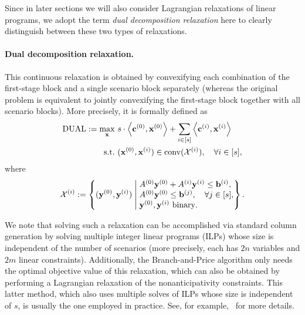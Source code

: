 \documentclass{article}
\DeclareMathOperator{\conv}{\operatorname{conv}}
\newcommand{\cv}[0]{\mathbf{c}}
\newcommand{\xv}[0]{\mathbf{x}}
\newcommand{\yv}[0]{\mathbf{y}}
\newcommand{\bv}[0]{\mathbf{b}}
\newcommand{\iprod}[2]{\left\langle {#1}, {#2} \right\rangle}
\newcommand{\LAG}{\textup{DUAL}}
\begin{document}
Since in later sections we will also consider Lagrangian relaxations of linear programs, we adopt the term \emph{dual decomposition relaxation} here to clearly distinguish between these two types of relaxations.

\paragraph{Dual decomposition relaxation.} This continuous relaxation is obtained by convexifying each combination of the first-stage block and a single scenario block separately (whereas the original problem is equivalent to jointly convexifying the first-stage block together with all scenario blocks). More precisely, it is formally defined as
\begin{equation}
    \label{eq:lagrelax}
    \begin{aligned}
    \LAG := \max_{\xv} \ & s \cdot \iprod{\cv^{(0)}}{\xv^{(0)}} + \sum_{i \in [s]} \iprod{\cv^{(i)}}{\xv^{(i)}} \\
    \text{s.t.}\ & (\xv^{(0)}, \xv^{(i)}) \in \conv(\mathcal{X}^{(i)}), \quad \forall i \in [s],
    \end{aligned}
\end{equation}
where
\[
\mathcal{X}^{(i)} :=
\left\{
(\yv^{(0)}, \yv^{(i)}) \;\middle\vert\;
\begin{array}{@{}l@{}}
A^{(0)} \yv^{(0)} + A^{(i)} \yv^{(i)} \leq \bv^{(i)}, \\
A^{(0)} \yv^{(0)} \leq \bv^{(j)}, \quad \forall j \in [s], \\
\yv^{(0)}, \yv^{(i)} \text{ binary}.
\end{array}
\right\}.
\]

We note that solving such a relaxation can be accomplished via standard column generation by solving multiple integer linear programs (ILPs) whose size is independent of the number of scenarios (more precisely, each has $2n$ variables and $2m$ linear constraints). Additionally, the Branch-and-Price algorithm only needs the optimal objective value of this relaxation, which can also be obtained by performing a Lagrangian relaxation of the nonanticipativity constraints. This latter method, which also uses multiple solves of ILPs whose size is independent of $s$, is usually the one employed in practice. See, for example,~\cite{boland2018combining} for more details. %
\end{document}
